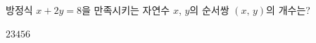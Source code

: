 방정식 $x+2y=8$을 만족시키는 자연수 $x$, $y$의 순서쌍 $(x,\,y)$의 개수는?
\begin{choices32}{$2$}{$3$}{$4$}{$5$}{$6$}\end{choices32}
